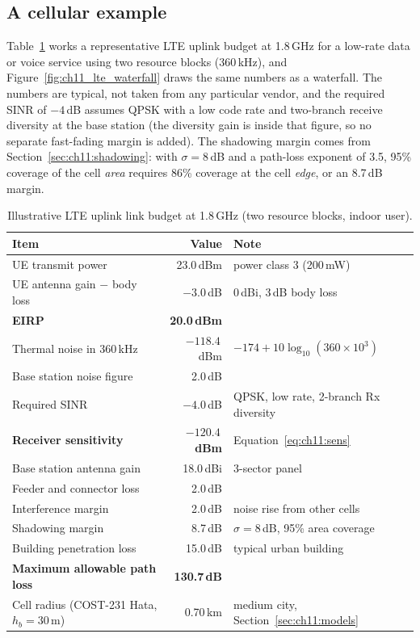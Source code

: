 \subsection{A cellular example}

Table~\ref{tab:ch11:lte} works a representative LTE uplink budget at 1.8\,GHz for a low-rate
data or voice service using two resource blocks (360\,kHz), and Figure~\ref{fig:ch11_lte_waterfall}
draws the same numbers as a waterfall. The numbers are typical, not taken from any particular
vendor, and the required SINR of $-4$\,dB assumes QPSK with a low code rate and two-branch
receive diversity at the base station (the diversity gain is inside that figure, so no separate
fast-fading margin is added). The shadowing margin comes from Section~\ref{sec:ch11:shadowing}:
with $\sigma=8$\,dB and a path-loss exponent of 3.5, 95\% coverage of the cell \emph{area}
requires 86\% coverage at the cell \emph{edge}, or an 8.7\,dB margin.

\begin{table}[htbp]\centering\small
\caption{Illustrative LTE uplink link budget at 1.8\,GHz (two resource blocks, indoor user).}
\label{tab:ch11:lte}
\begin{tabular}{@{}lrl@{}}
\toprule
Item & Value & Note \\
\midrule
UE transmit power & 23.0\,dBm & power class 3 (200\,mW)\\
UE antenna gain $-$ body loss & $-3.0$\,dB & 0\,dBi, 3\,dB body loss\\
\textbf{EIRP} & \textbf{20.0\,dBm} & \\
\addlinespace
Thermal noise in 360\,kHz & $-118.4$\,dBm & $-174+10\log_{10}(360\times10^3)$\\
Base station noise figure & 2.0\,dB & \\
Required SINR & $-4.0$\,dB & QPSK, low rate, 2-branch Rx diversity\\
\textbf{Receiver sensitivity} & $\mathbf{-120.4}$\,\textbf{dBm} & Equation~\eqref{eq:ch11:sens}\\
\addlinespace
Base station antenna gain & 18.0\,dBi & 3-sector panel\\
Feeder and connector loss & 2.0\,dB & \\
Interference margin & 2.0\,dB & noise rise from other cells\\
Shadowing margin & 8.7\,dB & $\sigma=8$\,dB, 95\% area coverage\\
Building penetration loss & 15.0\,dB & typical urban building\\
\midrule
\textbf{Maximum allowable path loss} & \textbf{130.7\,dB} & \\
Cell radius (COST-231 Hata, $h_b=30$\,m) & 0.70\,km & medium city, Section~\ref{sec:ch11:models}\\
\bottomrule
\end{tabular}
\end{table}

